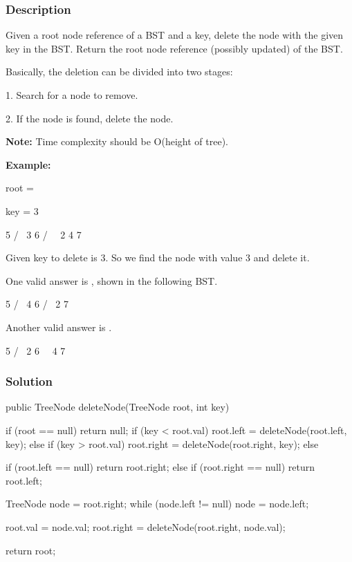 \subsubsection{Description}
Given a root node reference of a BST and a key, delete the node with the given key in the BST. Return the root node reference (possibly updated) of the BST.

Basically, the deletion can be divided into two stages:

1. Search for a node to remove.

2. If the node is found, delete the node.

\textbf{Note:} Time complexity should be O(height of tree).

\textbf{Example:}

root = \code{[5,3,6,2,4,null,7]}

key = 3
\begin{Code}
    5
   / \
  3   6
 / \   \
2   4   7
\end{Code}

Given key to delete is 3. So we find the node with value 3 and delete it.

One valid answer is \code{[5,4,6,2,null,null,7]}, shown in the following BST.
\begin{Code}
    5
   / \
  4   6
 /     \
2       7
\end{Code}

Another valid answer is .
\begin{Code}
    5
   / \
  2   6
   \   \
    4   7
\end{Code}

\newpage

\subsubsection{Solution}

\begin{Code}
public TreeNode deleteNode(TreeNode root, int key) {
    if (root == null) {
        return null;
    }
    if (key < root.val) {
        root.left = deleteNode(root.left, key);
    } else if (key > root.val) {
        root.right = deleteNode(root.right, key);
    } else {
        if (root.left == null) {
            return root.right;
        } else if (root.right == null) {
            return root.left;
        }

        TreeNode node = root.right;
        while (node.left != null) {
            node = node.left;
        }

        root.val = node.val;
        root.right = deleteNode(root.right, node.val);
    }

    return root;
}
\end{Code}

